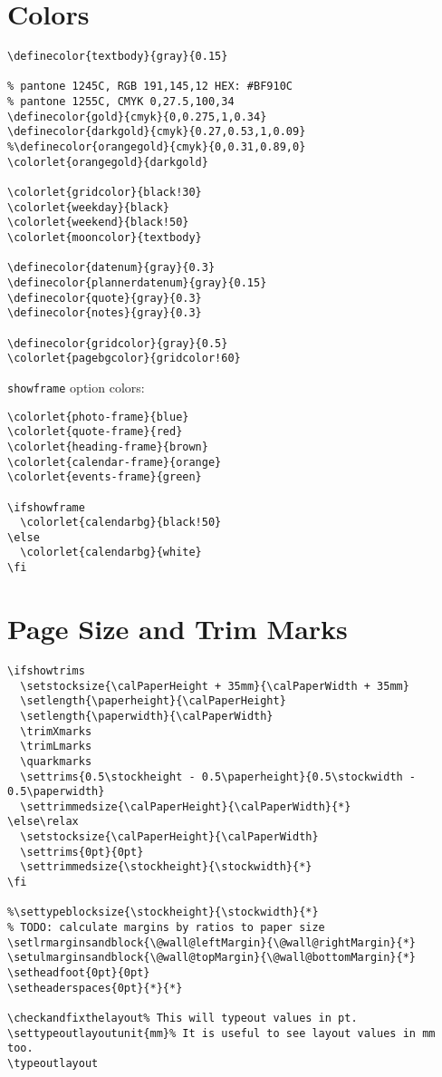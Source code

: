 \documentclass[11pt,oneside]{memoir-article}
\begin{document}
\section{Colors}
\label{sec:org281ee7a}

\begin{verbatim}
\definecolor{textbody}{gray}{0.15}

% pantone 1245C, RGB 191,145,12 HEX: #BF910C
% pantone 1255C, CMYK 0,27.5,100,34
\definecolor{gold}{cmyk}{0,0.275,1,0.34}
\definecolor{darkgold}{cmyk}{0.27,0.53,1,0.09}
%\definecolor{orangegold}{cmyk}{0,0.31,0.89,0}
\colorlet{orangegold}{darkgold}

\colorlet{gridcolor}{black!30}
\colorlet{weekday}{black}
\colorlet{weekend}{black!50}
\colorlet{mooncolor}{textbody}

\definecolor{datenum}{gray}{0.3}
\definecolor{plannerdatenum}{gray}{0.15}
\definecolor{quote}{gray}{0.3}
\definecolor{notes}{gray}{0.3}

\definecolor{gridcolor}{gray}{0.5}
\colorlet{pagebgcolor}{gridcolor!60}
\end{verbatim}

\texttt{showframe} option colors:

\begin{verbatim}
\colorlet{photo-frame}{blue}
\colorlet{quote-frame}{red}
\colorlet{heading-frame}{brown}
\colorlet{calendar-frame}{orange}
\colorlet{events-frame}{green}

\ifshowframe
  \colorlet{calendarbg}{black!50}
\else
  \colorlet{calendarbg}{white}
\fi
\end{verbatim}

\section{Page Size and Trim Marks}
\label{sec:orgf70f7fe}

\begin{verbatim}
\ifshowtrims
  \setstocksize{\calPaperHeight + 35mm}{\calPaperWidth + 35mm}
  \setlength{\paperheight}{\calPaperHeight}
  \setlength{\paperwidth}{\calPaperWidth}
  \trimXmarks
  \trimLmarks
  \quarkmarks
  \settrims{0.5\stockheight - 0.5\paperheight}{0.5\stockwidth - 0.5\paperwidth}
  \settrimmedsize{\calPaperHeight}{\calPaperWidth}{*}
\else\relax
  \setstocksize{\calPaperHeight}{\calPaperWidth}
  \settrims{0pt}{0pt}
  \settrimmedsize{\stockheight}{\stockwidth}{*}
\fi

%\settypeblocksize{\stockheight}{\stockwidth}{*}
% TODO: calculate margins by ratios to paper size
\setlrmarginsandblock{\@wall@leftMargin}{\@wall@rightMargin}{*}
\setulmarginsandblock{\@wall@topMargin}{\@wall@bottomMargin}{*}
\setheadfoot{0pt}{0pt}
\setheaderspaces{0pt}{*}{*}

\checkandfixthelayout% This will typeout values in pt.
\settypeoutlayoutunit{mm}% It is useful to see layout values in mm too.
\typeoutlayout
\end{verbatim}
\end{document}
